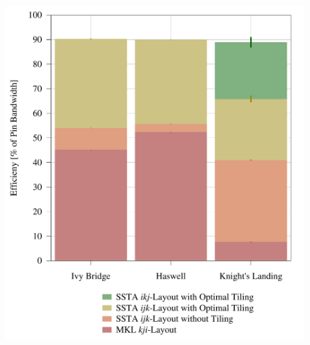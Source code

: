 \documentclass{sig-alternate-05-2015}
\begin{document}
\begin{figure}[!bth]
\begin{minipage}{0.49\textwidth}
    \includegraphics[width=0.95\columnwidth]{figures/post_tsb_impact_of_optimizations_histogram_09_03_2016_09_04_2016_1socket.pdf}
  \end{minipage}
\end{figure}

\end{document}
